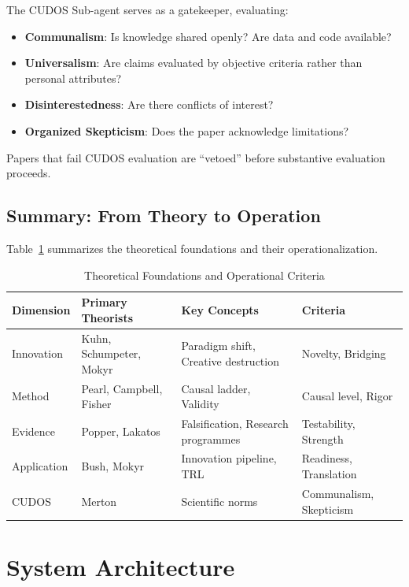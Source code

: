 \documentclass[11pt,a4paper]{article}
\begin{document}
The CUDOS Sub-agent serves as a gatekeeper, evaluating:
\begin{itemize}
    \item \textbf{Communalism}: Is knowledge shared openly? Are data and code available?
    \item \textbf{Universalism}: Are claims evaluated by objective criteria rather than personal attributes?
    \item \textbf{Disinterestedness}: Are there conflicts of interest?
    \item \textbf{Organized Skepticism}: Does the paper acknowledge limitations?
\end{itemize}

Papers that fail CUDOS evaluation are ``vetoed'' before substantive evaluation proceeds.

\subsection{Summary: From Theory to Operation}

Table~\ref{tab:theory-mapping} summarizes the theoretical foundations and their operationalization.

\begin{table}[t]
\centering
\caption{Theoretical Foundations and Operational Criteria}
\label{tab:theory-mapping}
\begin{tabular}{@{}llll@{}}
\toprule
\textbf{Dimension} & \textbf{Primary Theorists} & \textbf{Key Concepts} & \textbf{Criteria} \\
\midrule
Innovation & Kuhn, Schumpeter, Mokyr & Paradigm shift, Creative destruction & Novelty, Bridging \\
Method & Pearl, Campbell, Fisher & Causal ladder, Validity & Causal level, Rigor \\
Evidence & Popper, Lakatos & Falsification, Research programmes & Testability, Strength \\
Application & Bush, Mokyr & Innovation pipeline, TRL & Readiness, Translation \\
CUDOS & Merton & Scientific norms & Communalism, Skepticism \\
\bottomrule
\end{tabular}
\end{table}

\section{System Architecture}
\label{sec:architecture}
\end{document}
